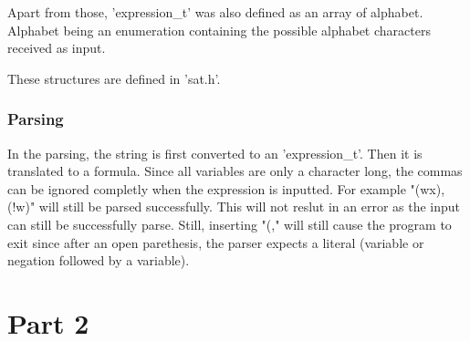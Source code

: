\documentclass[a4paper, 12pt]{article}
\begin{document}
Apart from those, 'expression\_t' was also defined as an array of alphabet. Alphabet being an enumeration
containing the possible alphabet characters received as input.

These structures are defined in 'sat.h'.

\subsubsection{Parsing}
In the parsing, the string is first converted to an 'expression\_t'. Then it is translated to a formula. Since all variables are 
only a character long, the commas can be ignored completly when the expression is inputted. For example "(wx), (!w)" will still be parsed successfully. 
This will not reslut in an error as the input can still be successfully parse. 
Still, inserting "(," will still cause the program to exit since after an open parethesis, 
the parser expects a literal (variable or negation followed by a variable).

\section{Part 2}
\end{document}
